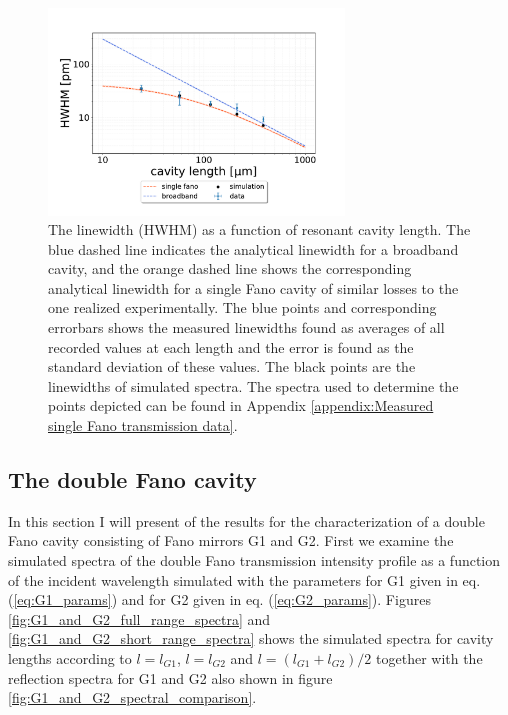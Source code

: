 \begin{figure}[h!]
    \centering
    \includegraphics[width=0.7\textwidth]{figures/results/HWHM_vs_cavity_length_single_fano.pdf}
    \caption{The linewidth (HWHM) as a function of resonant cavity length. The blue dashed line indicates the analytical linewidth for a broadband cavity, and the orange dashed line shows the corresponding analytical linewidth for a single Fano cavity of similar losses to the one realized experimentally. The blue points and corresponding errorbars shows the measured linewidths found as averages of all recorded values at each length and the error is found as the standard deviation of these values. The black points are the linewidths of simulated spectra. The spectra used to determine the points depicted can be found in Appendix \ref{appendix:Measured single Fano transmission data}.}
    \label{fig:HWHM_vs_length_single_fano_data}
\end{figure}

\newpage
\subsection{The double Fano cavity}\label{sec:the_double_fano_cavity_results}

In this section I will present of the results for the characterization of a double Fano cavity consisting of Fano mirrors G1 and G2. First we examine the simulated spectra of the double Fano transmission intensity profile as a function of the incident wavelength simulated with the parameters for G1 given in eq. (\ref{eq:G1_params}) and for G2 given in eq. (\ref{eq:G2_params}). Figures \ref{fig:G1_and_G2_full_range_spectra} and \ref{fig:G1_and_G2_short_range_spectra} shows the simulated spectra for cavity lengths according to $l=l_{G1}$, $l=l_{G2}$ and $l=(l_{G1}+l_{G2})/2$ together with the reflection spectra for G1 and G2 also shown in figure \ref{fig:G1_and_G2_spectral_comparison}. 

